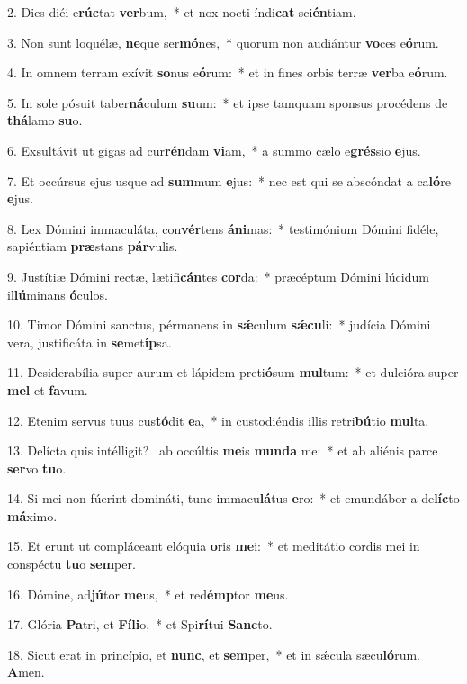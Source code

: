 2. Dies diéi e\textbf{rúc}tat \textbf{ver}bum,~*  et nox nocti índi\textbf{cat} sci\textbf{én}tiam.\

3. Non sunt loquélæ, \textbf{ne}que ser\textbf{mó}nes,~*  quorum non audiántur \textbf{vo}ces e\textbf{ó}rum.\

4. In omnem terram exívit \textbf{so}nus e\textbf{ó}rum:~*  et in fines orbis terræ \textbf{ver}ba e\textbf{ó}rum.\

5. In sole pósuit taber\textbf{ná}culum \textbf{su}um:~*  et ipse tamquam sponsus procédens de \textbf{thá}lamo \textbf{su}o.\

6. Exsultávit ut gigas ad cur\textbf{rén}dam \textbf{vi}am,~*  a summo cælo e\textbf{grés}sio \textbf{e}jus.\

7. Et occúrsus ejus usque ad \textbf{sum}mum \textbf{e}jus:~*  nec est qui se abscóndat a ca\textbf{ló}re \textbf{e}jus.\

8. Lex Dómini immaculáta, con\textbf{vér}tens \textbf{á}\textbf{ni}mas:~*  testimónium Dómini fidéle, sapiéntiam \textbf{præ}stans \textbf{pár}vulis.\

9. Justítiæ Dómini rectæ, lætifi\textbf{cán}tes \textbf{cor}da:~*  præcéptum Dómini lúcidum il\textbf{lú}minans \textbf{ó}culos.\

10. Timor Dómini sanctus, pérmanens in \textbf{sǽ}culum \textbf{sǽ}\textbf{cu}li:~*  judícia Dómini vera, justificáta in \textbf{se}met\textbf{íp}sa.\

11. Desiderabília super aurum et lápidem preti\textbf{ó}sum \textbf{mul}tum:~*  et dulcióra super \textbf{mel} et \textbf{fa}vum.\

12. Etenim servus tuus cus\textbf{tó}dit \textbf{e}a,~*  in custodiéndis illis retri\textbf{bú}tio \textbf{mul}ta.\

13. Delícta quis intélligit? \dag\  ab occúltis \textbf{me}is \textbf{mun}\textbf{da} me:~*  et ab aliénis parce \textbf{ser}vo \textbf{tu}o.\

14. Si mei non fúerint domináti, tunc immacu\textbf{lá}tus \textbf{e}ro:~*  et emundábor a de\textbf{líc}to \textbf{má}ximo.\

15. Et erunt ut compláceant elóquia \textbf{o}ris \textbf{me}i:~*  et meditátio cordis mei in conspéctu \textbf{tu}o \textbf{sem}per.\

16. Dómine, ad\textbf{jú}tor \textbf{me}us,~*  et red\textbf{émp}tor \textbf{me}us.\

17. Glória \textbf{Pa}tri, et \textbf{Fí}\textbf{li}o,~*  et Spi\textbf{rí}tui \textbf{Sanc}to.\

18. Sicut erat in princípio, et \textbf{nunc}, et \textbf{sem}per,~*  et in sǽcula sæcu\textbf{ló}rum. \textbf{A}men.\

